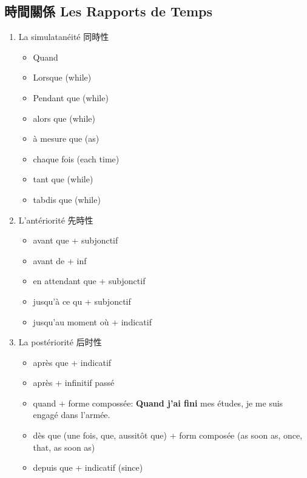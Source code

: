 \documentclass{book}
\begin{document}
        \subsection{時間關係 Les Rapports de Temps}
            \begin{enumerate}
                \item La simulatanéité 同時性
                    \begin{itemize}
                        \item Quand
                        \item Lorsque (while)
                        \item Pendant que (while)
                        \item alors que (while)
                        \item à mesure que (as)
                        \item chaque fois (each time)
                        \item tant que (while)
                        \item tabdis que (while)
                    \end{itemize}
                \item L'antériorité 先時性
                    \begin{itemize}
                        \item avant que + subjonctif
                        \item avant de + inf
                        \item en attendant que + subjonctif
                        \item jusqu'à ce qu + subjonctif
                        \item jusqu'au moment où + indicatif
                    \end{itemize}
                \item La postériorité 后时性
                    \begin{itemize}
                        \item après que + indicatif
                        \item après + infinitif passé
                        \item quand + forme compossée: \textbf{Quand j'ai fini} mes études, je me suis engagé dans l'armée.
                        \item dès que (une fois, que, aussitôt que) + form composée (as soon as, once, that, as soon as)
                        \item depuis que + indicatif (since)
                    \end{itemize}
            \end{enumerate}
    
\end{document}
